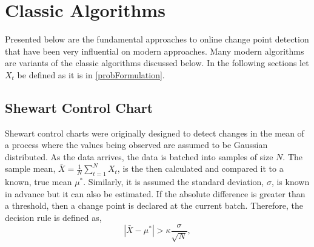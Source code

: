 \iffalse
Other standard classifier metrics can also used for comparing $\hat{t}$ and $t^*$. This includes the  F1-Score that is based on a classifier's precision and recall:
\begin{equation}
F_1(\hat{t}, t^*) = 2 * \frac{\text{precision*recall}}{\text{precision + recall}}
\end{equation}

F1-Score is defined as the harmonic mean of precision and recall. Precision is defined as the ratio of true positives (TP) to the
number of true positives (TP) and false positives (FP) and recall is defined as the ratio the number of true positives to the
number of true positives plus the number of false negatives. F1-Score is best when F1 = 1 (perfect precision and recall) and reaches its worst value at F1 = 0. Depending on the context, any other classifier evaluation tools such as the Receiver Operating Characteristics Curve and the Precision Recall Curve may be used as well.
\fi

\section{Classic Algorithms}
\label{classic_algo}
Presented below are the fundamental approaches to online change point detection that have been very influential on modern approaches. Many modern algorithms are variants of the classic algorithms discussed below. In the following sections let $X_t$ be defined as it is in \ref{probFormulation}.

\subsection{Shewart Control Chart}
Shewart control charts were originally designed to detect changes in the mean of a process where the values being observed are assumed to be Gaussian distributed. As the data arrives, the data is batched into samples of size $N$. The sample mean, $\bar{X}=\frac{1}{N} \sum_{t=1}^N X_t$, is the then calculated and compared it to a known, true mean $\mu^*$.  Similarly, it is assumed the standard deviation, $\sigma$, is known in advance but it can also be estimated. If the absolute difference is greater than a threshold, then a change point is declared at the current batch. Therefore, the decision rule is defined as,
\begin{equation}
|\bar{X}-\mu^*| > \kappa \frac{\sigma}{\sqrt{N}},
\end{equation}

